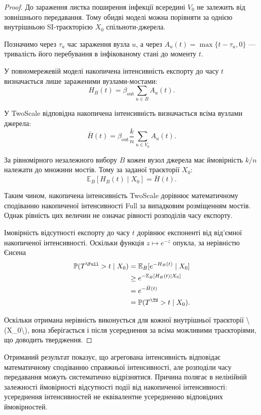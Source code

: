 \begin{proof}
До зараження листка поширення інфекції всередині $V_0$ не залежить від зовнішнього передавання. Тому обидві моделі можна порівняти за однією внутрішньою SI-траєкторією $X_0$ спільноти-джерела.

Позначимо через $\tau_u$ час зараження вузла $u$, а через $A_u(t)=\max\{t-\tau_u,0\}$ --- тривалість його перебування
в інфікованому стані до моменту $t$.

У повномережевій моделі накопичена інтенсивність експорту до часу $t$ визначається лише зараженими вузлами-мостами:
\[
H_B(t)
=
\beta_{\mathrm{out}}\sum_{u\in B}A_u(t).
\]

У TwoScale відповідна накопичена інтенсивність визначається всіма вузлами джерела:
\[
\bar H(t)
=
\beta_{\mathrm{out}}\frac{k}{n}
\sum_{u\in V_0}A_u(t).
\]

За рівномірного незалежного вибору $B$ кожен вузол джерела має ймовірність $k/n$ належати до множини мостів. Тому за заданої траєкторії $X_0$:
\[
\mathbb{E}_B[H_B(t)\mid X_0]
=
\bar H(t).
\]

Таким чином, накопичена інтенсивність TwoScale дорівнює математичному сподіванню накопиченої інтенсивності Full за випадковим розміщенням мостів. Однак рівність цих величин не означає рівності розподілів часу експорту.

Імовірність відсутності експорту до часу $t$ дорівнює експоненті від від'ємної накопиченої інтенсивності. Оскільки функція $z\mapsto e^{-z}$ опукла, за нерівністю Єнсена
\[
\begin{aligned}
\mathbb{P}(T^{\Full}>t\mid X_0)
&=
\mathbb{E}_B[e^{-H_B(t)}\mid X_0]
\\
&\geq
e^{-\mathbb{E}_B[H_B(t)\mid X_0]}
\\
&=
e^{-\bar H(t)}
\\
&=
\mathbb{P}(T^{\TS}>t\mid X_0).
\end{aligned}
\]

Оскільки отримана нерівність виконується для кожної внутрішньої траєкторії \textbackslash{}(X\_0\textbackslash{}), вона зберігається і після усереднення за всіма можливими траєкторіями, що доводить твердження. 
\end{proof}

Отриманий результат показує, що агрегована інтенсивність відповідає математичному сподіванню справжньої інтенсивності, але розподіли часу передавання можуть систематично відрізнятися. Причина полягає в нелінійній залежності ймовірності відсутності події від накопиченої інтенсивності: усереднення інтенсивностей не еквівалентне усередненню відповідних ймовірностей.


